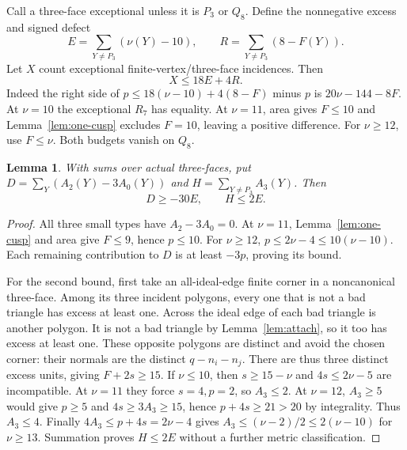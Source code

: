 \documentclass[11pt]{article}
\newtheorem{lemma}[theorem]{Lemma}
\newcommand{\Pthree}{P_3}
\newcommand{\Qeight}{Q_8}
\begin{document}
Call a three-face exceptional unless it is $\Pthree$ or $\Qeight$.
Define the nonnegative excess and signed defect
\begin{equation}\label{eq:ERdef}
 E=\sum_{Y\ne\Pthree}(\nu(Y)-10),\qquad
 R=\sum_{Y\ne\Pthree}(8-F(Y)).
\end{equation}
Let $X$ count exceptional finite-vertex/three-face incidences. Then
\begin{equation}\label{eq:Xbudget}
 X\le18E+4R.
\end{equation}
Indeed the right side of $p\le18(\nu-10)+4(8-F)$ minus $p$
is $20\nu-144-8F$. At $\nu=10$ the exceptional $R_7$ has equality.
At $\nu=11$, area gives $F\le10$ and Lemma~\ref{lem:one-cusp}
excludes $F=10$, leaving a positive difference. For $\nu\ge12$,
use $F\le\nu$. Both budgets vanish on $\Qeight$.

\begin{lemma}\label{lem:Hbudget}
With sums over actual three-faces, put
$D=\sum_Y(A_2(Y)-3A_0(Y))$ and
$H=\sum_{Y\ne\Pthree}A_3(Y)$. Then
\begin{equation}\label{eq:DH}
 D\ge-30E,\qquad H\le2E.
\end{equation}
\end{lemma}
\begin{proof}
All three small types have $A_2-3A_0=0$. At $\nu=11$,
Lemma~\ref{lem:one-cusp} and area give $F\le9$, hence $p\le10$.
For $\nu\ge12$, $p\le2\nu-4\le10(\nu-10)$.
Each remaining contribution to $D$ is at least $-3p$, proving its bound.

For the second bound, first take an all-ideal-edge finite corner in
a noncanonical three-face. Among its three incident polygons, every
one that is not a bad triangle has excess at least one. Across the
ideal edge of each bad triangle is another polygon. It is not a bad
triangle by Lemma~\ref{lem:attach}, so it too has excess at least one.
These opposite polygons are distinct and avoid the chosen corner:
their normals are the distinct $q-n_i-n_j$. There are thus three
distinct excess units, giving $F+2s\ge15$.
If $\nu\le10$, then $s\ge15-\nu$ and $4s\le2\nu-5$ are
incompatible. At $\nu=11$ they force $s=4,p=2$, so $A_3\le2$.
At $\nu=12$, $A_3\ge5$ would give $p\ge5$ and
$4s\ge3A_3\ge15$, hence $p+4s\ge21>20$ by integrality.
Thus $A_3\le4$. Finally $4A_3\le p+4s=2\nu-4$ gives
$A_3\le(\nu-2)/2\le2(\nu-10)$ for $\nu\ge13$.
Summation proves $H\le2E$ without a further metric classification.
\end{proof}
\end{document}
